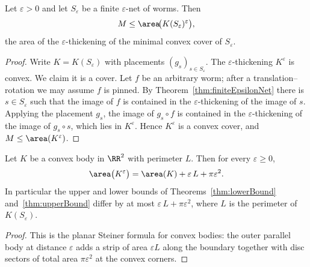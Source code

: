 \begin{theorem}
    \label{thm:upperBound}
    Let $\varepsilon > 0$ and let $S_\varepsilon$ be a finite
    $\varepsilon$-net of worms. Then
    \[
        M \le \area\!\big(K(S_\varepsilon)^{\varepsilon}\big),
    \]
    the area of the $\varepsilon$-thickening of the minimal convex cover of
    $S_\varepsilon$.
\end{theorem}
\begin{proof}
    Write $K = K(S_\varepsilon)$ with placements $(g_s)_{s \in S_\varepsilon}$.
    The $\varepsilon$-thickening $K^{\varepsilon}$ is convex. We claim it is a
    cover. Let $f$ be an arbitrary worm; after a translation--rotation we may
    assume $f$ is pinned. By Theorem~\ref{thm:finiteEpsilonNet} there is
    $s \in S_\varepsilon$ such that the image of $f$ is contained in the
    $\varepsilon$-thickening of the image of $s$. Applying the placement $g_s$,
    the image of $g_s \circ f$ is contained in the $\varepsilon$-thickening of
    the image of $g_s \circ s$, which lies in $K^{\varepsilon}$. Hence
    $K^{\varepsilon}$ is a convex cover, and $M \le \area(K^{\varepsilon})$.
\end{proof}

\begin{theorem}
    \label{thm:steinerGap}
    Let $K$ be a convex body in $\RR^2$ with perimeter $L$. Then for every
    $\varepsilon \ge 0$,
    \[
        \area\big(K^{\varepsilon}\big)
            = \area(K) + \varepsilon\, L + \pi \varepsilon^{2}.
    \]
    In particular the upper and lower bounds of
    Theorems~\ref{thm:lowerBound} and~\ref{thm:upperBound} differ by at most
    $\varepsilon\, L + \pi \varepsilon^{2}$, where $L$ is the perimeter of
    $K(S_\varepsilon)$.
\end{theorem}
\begin{proof}
    This is the planar Steiner formula for convex bodies: the outer parallel
    body at distance $\varepsilon$ adds a strip of area $\varepsilon L$ along
    the boundary together with disc sectors of total area $\pi \varepsilon^2$ at
    the convex corners.
\end{proof}

